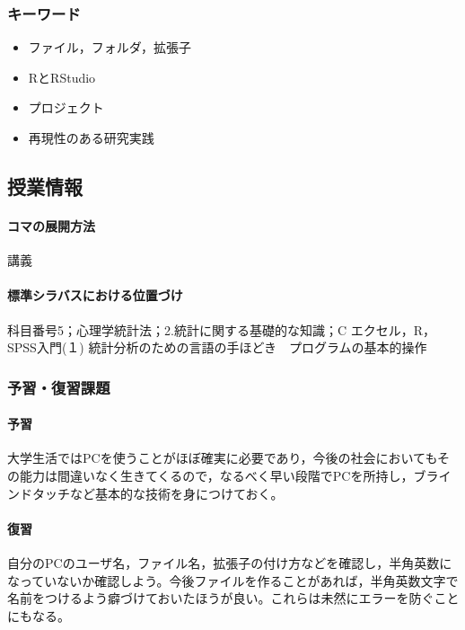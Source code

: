 \subsubsection{キーワード}
\begin{itemize}
	\item ファイル，フォルダ，拡張子
	\item RとRStudio
	\item プロジェクト
	\item 再現性のある研究実践
\end{itemize}
\subsection{授業情報}
\paragraph{コマの展開方法}
講義
\paragraph{標準シラバスにおける位置づけ}
科目番号5；心理学統計法；2.統計に関する基礎的な知識；C エクセル，R，SPSS入門(１) 統計分析のための言語の手ほどき　プログラムの基本的操作
\subsubsection{予習・復習課題}
\paragraph{予習}大学生活ではPCを使うことがほぼ確実に必要であり，今後の社会においてもその能力は間違いなく生きてくるので，なるべく早い段階でPCを所持し，ブラインドタッチなど基本的な技術を身につけておく。
\paragraph{復習}自分のPCのユーザ名，ファイル名，拡張子の付け方などを確認し，半角英数になっていないか確認しよう。今後ファイルを作ることがあれば，半角英数文字で名前をつけるよう癖づけておいたほうが良い。これらは未然にエラーを防ぐことにもなる。
